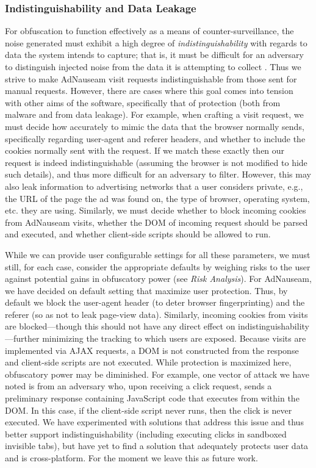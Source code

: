 \documentclass[conference]{IEEEtran}
\begin{document}
\subsubsection{Indistinguishability and Data Leakage}

For obfuscation to function effectively as a means of counter-surveillance, the noise generated must exhibit a high degree of \emph{indistinguishability} with regards to data the system intends to capture; that is, it must be difficult for an adversary to distinguish injected noise from the data it is attempting to collect \cite{Gervais,Balsa}. Thus we strive to make AdNauseam visit requests indistinguishable from those sent for manual requests. However, there are  cases where this goal comes into tension with other aims of the software, specifically that of protection (both from malware and from data leakage). For example, when crafting a visit request, we must decide how accurately to mimic the data that the browser normally sends, specifically regarding user-agent and referer headers, and whether to include the cookies normally sent with the request. If we match these exactly then our request is indeed indistinguishable (assuming the browser is not modified to hide such details), and thus more difficult for an adversary to filter. However, this may also leak information to advertising networks that a user considers private, e.g., the URL of the page the ad was found on, the type of browser, operating system, etc. they are using. Similarly, we must decide whether to block incoming cookies from AdNauseam visits, whether the DOM of incoming request should be parsed and executed, and whether client-side scripts should be allowed to run.

While we can provide user configurable settings for all these parameters, we must still, for each case, consider the appropriate defaults by weighing risks to the user against potential gains in obfuscatory power (see \emph{Risk Analysis}). For AdNauseam, we have decided on default setting that maximize user protection. Thus, by default we block the user-agent header (to deter browser fingerprinting) and the referer (so as not to leak page-view data). Similarly, incoming cookies from visits are blocked---though this should not have any direct effect on indistinguishability---further minimizing the tracking to which users are exposed. Because visits are implemented via AJAX requests, a DOM is not constructed from the response and client-side scripts are not executed. While protection is maximized here, obfuscatory power may be diminished. For example, one vector of attack we have noted is from an adversary who, upon receiving a click request, sends a preliminary response containing JavaScript code that executes from within the DOM. In this case, if the client-side script never runs, then the click is never executed. We have experimented with solutions that address this issue and thus better support indistinguishability (including executing clicks in sandboxed invisible tabs), but have yet to find a solution that adequately protects user data and is cross-platform. For the moment we leave this as future work.
\end{document}
